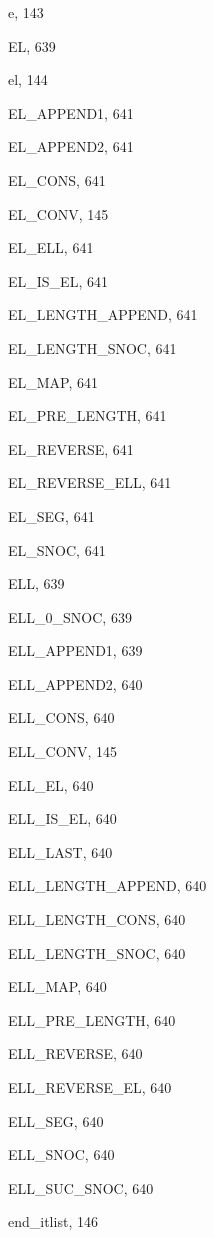 \begin{theindex}
  \item {\ptt e}, 143
  \item {\ptt EL}, 639
  \item {\ptt el}, 144
  \item {\ptt EL\_APPEND1}, 641
  \item {\ptt EL\_APPEND2}, 641
  \item {\ptt EL\_CONS}, 641
  \item {\ptt EL\_CONV}, 145
  \item {\ptt EL\_ELL}, 641
  \item {\ptt EL\_IS\_EL}, 641
  \item {\ptt EL\_LENGTH\_APPEND}, 641
  \item {\ptt EL\_LENGTH\_SNOC}, 641
  \item {\ptt EL\_MAP}, 641
  \item {\ptt EL\_PRE\_LENGTH}, 641
  \item {\ptt EL\_REVERSE}, 641
  \item {\ptt EL\_REVERSE\_ELL}, 641
  \item {\ptt EL\_SEG}, 641
  \item {\ptt EL\_SNOC}, 641
  \item {\ptt ELL}, 639
  \item {\ptt ELL\_0\_SNOC}, 639
  \item {\ptt ELL\_APPEND1}, 639
  \item {\ptt ELL\_APPEND2}, 640
  \item {\ptt ELL\_CONS}, 640
  \item {\ptt ELL\_CONV}, 145
  \item {\ptt ELL\_EL}, 640
  \item {\ptt ELL\_IS\_EL}, 640
  \item {\ptt ELL\_LAST}, 640
  \item {\ptt ELL\_LENGTH\_APPEND}, 640
  \item {\ptt ELL\_LENGTH\_CONS}, 640
  \item {\ptt ELL\_LENGTH\_SNOC}, 640
  \item {\ptt ELL\_MAP}, 640
  \item {\ptt ELL\_PRE\_LENGTH}, 640
  \item {\ptt ELL\_REVERSE}, 640
  \item {\ptt ELL\_REVERSE\_EL}, 640
  \item {\ptt ELL\_SEG}, 640
  \item {\ptt ELL\_SNOC}, 640
  \item {\ptt ELL\_SUC\_SNOC}, 640
  \item {\ptt end\_itlist}, 146

\end{theindex}
